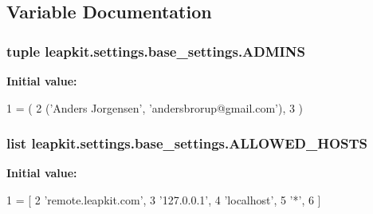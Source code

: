 \subsection{Variable Documentation}
\hypertarget{namespaceleapkit_1_1settings_1_1base__settings_aae81324607aa872afbde051c2768bd47}{
\subsubsection[{A\-D\-M\-I\-N\-S}]{\setlength{\rightskip}{0pt plus 5cm}tuple leapkit.\-settings.\-base\-\_\-settings.\-A\-D\-M\-I\-N\-S}}\label{namespaceleapkit_1_1settings_1_1base__settings_aae81324607aa872afbde051c2768bd47}
{\bfseries Initial value\-:}
\begin{DoxyCode}
1 = (
2     (\textcolor{stringliteral}{'Anders Jorgensen'}, \textcolor{stringliteral}{'andersbrorup@gmail.com'}),
3 )
\end{DoxyCode}
\hypertarget{namespaceleapkit_1_1settings_1_1base__settings_a8035a4c5be4c179f87f9b9f4ac55f0fc}{
\subsubsection[{A\-L\-L\-O\-W\-E\-D\-\_\-\-H\-O\-S\-T\-S}]{\setlength{\rightskip}{0pt plus 5cm}list leapkit.\-settings.\-base\-\_\-settings.\-A\-L\-L\-O\-W\-E\-D\-\_\-\-H\-O\-S\-T\-S}}\label{namespaceleapkit_1_1settings_1_1base__settings_a8035a4c5be4c179f87f9b9f4ac55f0fc}
{\bfseries Initial value\-:}
\begin{DoxyCode}
1 = [
2     \textcolor{stringliteral}{'remote.leapkit.com'},
3     \textcolor{stringliteral}{'127.0.0.1'},
4     \textcolor{stringliteral}{'localhost'},
5     \textcolor{stringliteral}{'*'},
6 ]
\end{DoxyCode}
